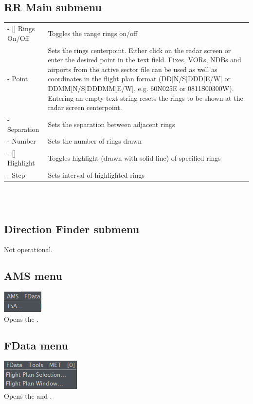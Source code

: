 \documentclass[11pt,a4paper,oldfontcommands]{memoir}
\begin{document}
\begin{tabular}{p{5cm}p{10cm}}
\end{tabular}\\\\

\subsection*{RR Main submenu}
\begin{tabular}{p{5cm}p{10cm}}
    - [] Rings On/Off & Toggles the range rings on/off
    \\- Point & Sets the rings centerpoint. Either click on the radar screen or
    enter the desired point in the text field. Fixes, VORs, NDBs and
    airports from the active sector file can be used as well as
    coordinates in the flight plan format (DD[N/S]DDD[E/W] or
    DDMM[N/S]DDDMM[E/W], e.g. 60N025E or 0811S00300W).
    Entering an empty text string resets the rings to be shown at
    the radar screen centerpoint.
    \\- Separation & Sets the separation between adjacent rings
    \\- Number & Sets the number of rings drawn
    \\- [] Highlight & Toggles highlight (drawn with solid line) of specified rings
    \\- Step & Sets interval of highlighted rings
\end{tabular}\\\\

\subsection*{Direction Finder submenu}
Not operational.

\subsection{AMS menu}
\includegraphics{img/AMS.png}\\
Opens the \textit{}.

\subsection{FData menu}
\includegraphics{img/FData.png}\\
Opens the \textit{} and \textit{}.
\end{document}
